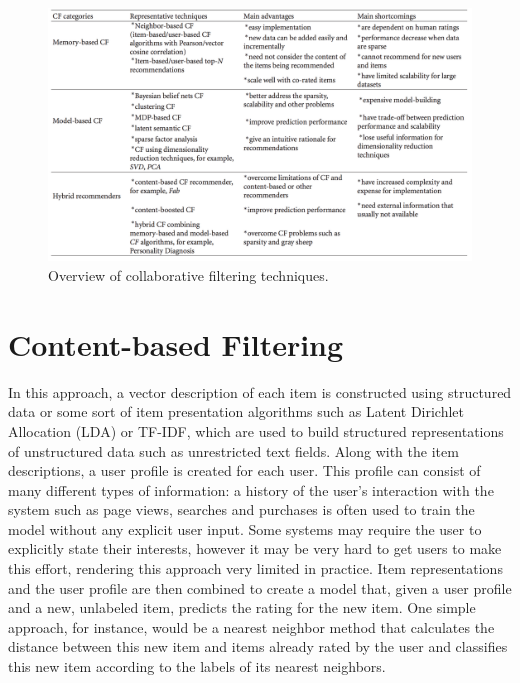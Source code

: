\documentclass[cic,tc,english]{iiufrgs}
\begin{document}
\begin{figure}[ht!]
    \caption{Overview of collaborative filtering techniques.}
    \begin{center}
        \includegraphics[width=35em]{cf-comparison}
    \end{center}
    \label{fig:cf-comparison}
\end{figure}

\section{Content-based Filtering} \label{cb}
In this approach, a vector description of each item is constructed using structured data or some sort of item presentation algorithms such as Latent Dirichlet Allocation (LDA) or TF-IDF, which are used to build structured representations of unstructured data such as unrestricted text fields. Along with the item descriptions, a user profile is created for each user. This profile can consist of many different types of information: a history of the user's interaction with the system such as page views, searches and purchases is often used to train the model without any explicit user input. Some systems may require the user to explicitly state their interests, however it may be very hard to get users to make this effort, rendering this approach very limited in practice. Item representations and the user profile are then combined to create a model that, given a user profile and a new, unlabeled item, predicts the rating for the new item. One simple approach, for instance, would be a nearest neighbor method that calculates the distance between this new item and items already rated by the user and classifies this new item according to the labels of its nearest neighbors.
\end{document}
